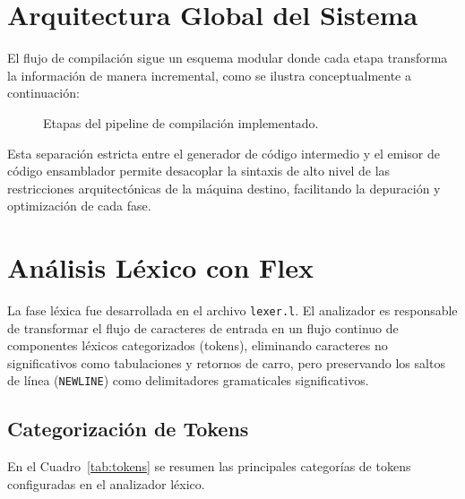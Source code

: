 \documentclass[conference]{IEEEtran}
\begin{document}
\section{Arquitectura Global del Sistema}
El flujo de compilación sigue un esquema modular donde cada etapa transforma la información de manera incremental, como se ilustra conceptualmente a continuación:

\begin{figure}[htbp]
\centering
{}
\caption{Etapas del pipeline de compilación implementado.}
\label{fig:pipeline}
\end{figure}

Esta separación estricta entre el generador de código intermedio y el emisor de código ensamblador permite desacoplar la sintaxis de alto nivel de las restricciones arquitectónicas de la máquina destino, facilitando la depuración y optimización de cada fase.

\section{Análisis Léxico con Flex}
La fase léxica fue desarrollada en el archivo \texttt{lexer.l}. El analizador es responsable de transformar el flujo de caracteres de entrada en un flujo continuo de componentes léxicos categorizados (tokens), eliminando caracteres no significativos como tabulaciones y retornos de carro, pero preservando los saltos de línea (\texttt{NEWLINE}) como delimitadores gramaticales significativos.

\subsection{Categorización de Tokens}
En el Cuadro~\ref{tab:tokens} se resumen las principales categorías de tokens configuradas en el analizador léxico.
\end{document}
